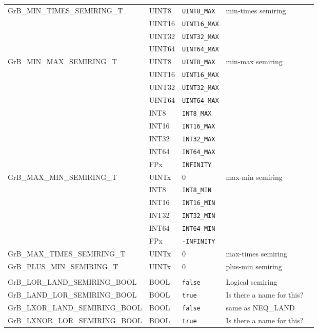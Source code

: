 \begin{table}
\begin{threeparttable}
\begin{tabular}{l|l|l|ll}
{\sf GrB\_MIN\_TIMES\_SEMIRING\_T}    & {\sf UINT8}  		     & {\tt UINT8\_MAX}         & min-times semiring 		\\
				      & {\sf UINT16} 		     & {\tt UINT16\_MAX}        & 				\\
				      & {\sf UINT32} 		     & {\tt UINT32\_MAX}        & 				\\
				      & {\sf UINT64} 		     & {\tt UINT64\_MAX}        & 				\\
{\sf GrB\_MIN\_MAX\_SEMIRING\_T}      & {\sf UINT8}  		     & {\tt UINT8\_MAX}         & min-max semiring 		\\
				      & {\sf UINT16} 		     & {\tt UINT16\_MAX}        & 				\\
				      & {\sf UINT32} 		     & {\tt UINT32\_MAX}        & 				\\
				      & {\sf UINT64} 		     & {\tt UINT64\_MAX}        & 				\\
				      & {\sf INT8}   		     & {\tt INT8\_MAX}  	& 				\\
				      & {\sf INT16}  		     & {\tt INT16\_MAX} 	& 				\\
				      & {\sf INT32}  		     & {\tt INT32\_MAX} 	& 				\\
				      & {\sf INT64}  		     & {\tt INT64\_MAX} 	& 				\\
				      & {\sf FPx}    		     & {\tt INFINITY}   	& 				\\
{\sf GrB\_MAX\_MIN\_SEMIRING\_T}      & {\sf UINTx} 		     & 0             	        & max-min semiring		\\
  				      & {\sf INT8}   		     & {\tt INT8\_MIN}  	& 				\\
				      & {\sf INT16}  		     & {\tt INT16\_MIN} 	& 				\\
				      & {\sf INT32}  		     & {\tt INT32\_MIN} 	& 				\\
				      & {\sf INT64}  		     & {\tt INT64\_MIN} 	& 				\\
				      & {\sf FPx}    		     & {\tt -INFINITY}  	& 				\\
{\sf GrB\_MAX\_TIMES\_SEMIRING\_T}    & {\sf UINTx} 		     & 0             		& max-times semiring 		\\
{\sf GrB\_PLUS\_MIN\_SEMIRING\_T}     & {\sf UINTx} 		     & 0             		& plus-min semiring  		\\
                                      & 			     & 				& 				\\
{\sf GrB\_LOR\_LAND\_SEMIRING\_BOOL}  & {\sf BOOL} 		     & {\tt false}   		& Logical semiring 		\\
{\sf GrB\_LAND\_LOR\_SEMIRING\_BOOL}  & {\sf BOOL} 		     & {\tt true}    		& Is there a name for this? 	\\
{\sf GrB\_LXOR\_LAND\_SEMIRING\_BOOL} & {\sf BOOL} 		     & {\tt false}   		& same as NEQ\_LAND 		\\
{\sf GrB\_LXNOR\_LOR\_SEMIRING\_BOOL} & {\sf BOOL} 		     & {\tt true}    		& Is there a name for this? 	\\
\end{tabular}


\end{threeparttable}
\end{table}
